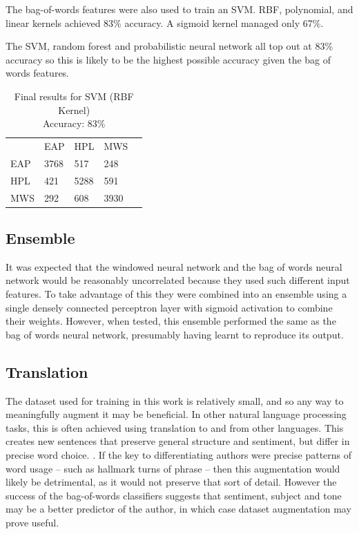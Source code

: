   The bag-of-words features were also used to train an SVM. RBF, polynomial, and
  linear kernels achieved 83\% accuracy. A sigmoid kernel managed only 67\%.

  The SVM, random forest and probabilistic neural network all top out at 83\%
  accuracy so this is likely to be the highest possible accuracy given the bag
  of words features. 

    \begin{table}[h]
\centering
\begin{tabular}{m{1cm}|m{1cm}|m{1cm}|m{1cm}|m{0cm}}
\multicolumn{1}{m{1cm}}{} & \multicolumn{1}{m{1cm}}{EAP} & \multicolumn{1}{m{1cm}}{HPL} & \multicolumn{1}{m{1cm}}{MWS} &\\[5pt]
\cline{2-4}
EAP & 3768 & 517 & 248 & \\[5pt]
\cline{2-4}
HPL & 421 & 5288 & 591 & \\[5pt]
\cline{2-4}
MWS & 292 & 608 & 3930 & \\[5pt]
\cline{2-4}
\end{tabular}
\caption{Final results for SVM (RBF Kernel)\\Accuracy: 83\% }
\label{tab:forest_res}
\end{table}

    \subsection{Ensemble}
    \label{sec:ensemble}

    It was expected that the windowed neural network and the bag of words neural
    network would be reasonably uncorrelated because they used such different
    input features. To take advantage of this they were combined into an
    ensemble using a single densely connected perceptron layer with sigmoid
    activation to combine their weights. However, when tested, this ensemble
    performed the same as the bag of words neural network, presumably having
    learnt to reproduce its output.
  
  \subsection{Translation}
  \label{sec:translation}

  The dataset used for training in this work is relatively small, and so any way to meaningfully augment it may be beneficial.
  In other natural language processing tasks, this is often achieved using translation to and from other languages. This creates new sentences that preserve general structure and sentiment, but differ in precise word choice.
  .
If the key to differentiating authors were precise patterns of word usage -- such as hallmark turns of phrase -- then this augmentation would likely be detrimental, as it would not preserve that sort of detail. However the success of the bag-of-words classifiers suggests that sentiment, subject and tone may be a better predictor of the author, in which case dataset augmentation may prove useful.

